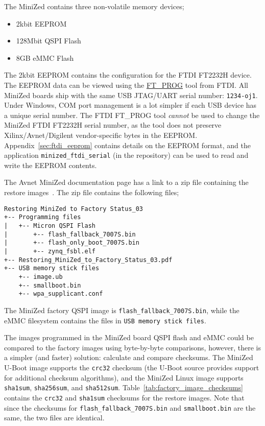 The MiniZed contains three non-volatile memory devices;
%
\begin{itemize}
\item 2kbit EEPROM
\item 128Mbit QSPI Flash
\item 8GB eMMC Flash
\end{itemize}
%
The 2kbit EEPROM contains the configuration for the FTDI FT2232H device.
The EEPROM data can be viewed using the
\href{https://www.ftdichip.com/Support/Utilities.htm#FT_PROG}{FT\_PROG}
tool from FTDI. All MiniZed boards ship with the same
USB JTAG/UART serial number: \verb+1234-oj1+. Under Windows, COM port
management is a lot simpler if each USB device has a unique serial number.
%
The FTDI FT\_PROG tool \emph{cannot} be used to change the MiniZed 
FTDI FT2232H serial number, as the tool does not preserve 
Xilinx/Avnet/Digilent vendor-specific bytes in the EEPROM.
%
Appendix~\ref{sec:ftdi_eeprom} contains details on the EEPROM format,
and the application \texttt{minized\_ftdi\_serial} (in the repository)
can be used to read and write the EEPROM contents.

The Avnet MiniZed documentation page has a link to a zip file containing
the restore images~\cite{Avnet_MiniZed_Restore_2018}. The zip file contains
the following files;
%
\begin{verbatim}
Restoring MiniZed to Factory Status_03
+-- Programming files
|   +-- Micron QSPI Flash
|       +-- flash_fallback_7007S.bin
|       +-- flash_only_boot_7007S.bin
|       +-- zynq_fsbl.elf
+-- Restoring_MiniZed_to_Factory_Status_03.pdf
+-- USB memory stick files
    +-- image.ub
    +-- smallboot.bin
    +-- wpa_supplicant.conf
\end{verbatim}
%
The MiniZed factory QSPI image is \verb+flash_fallback_7007S.bin+,
while the eMMC filesystem contains the files in \verb+USB memory stick files+.

The images programmed in the MiniZed board QSPI flash and eMMC could be
compared to the factory images using byte-by-byte comparisons, however,
there is a simpler (and faster) solution: calculate and compare checksums.
The MiniZed U-Boot image supports the \verb+crc32+ checksum (the U-Boot
source provides support for additional checksum algorithms), and the MiniZed Linux image
supports \verb+sha1sum+, \verb+sha256sum+, and \verb+sha512sum+.
Table~\ref{tab:factory_image_checksums} contains the \verb+crc32+
and \verb+sha1sum+ checksums for the restore images. Note that since
the checksums for  \verb+flash_fallback_7007S.bin+ and \verb+smallboot.bin+
are the same, the two files are identical.


